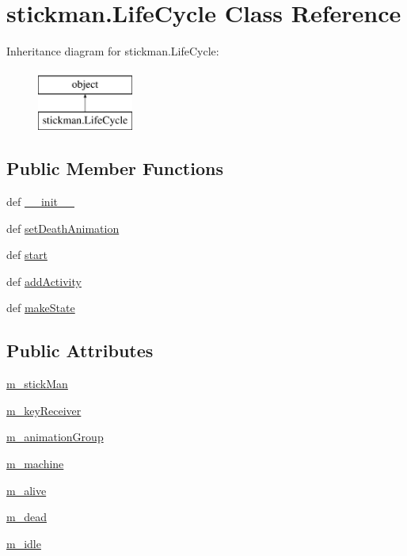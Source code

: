 \hypertarget{classstickman_1_1LifeCycle}{}\section{stickman.\+Life\+Cycle Class Reference}
\label{classstickman_1_1LifeCycle}
Inheritance diagram for stickman.\+Life\+Cycle\+:\begin{figure}[H]
\begin{center}
\leavevmode
\includegraphics[height=2.000000cm]{classstickman_1_1LifeCycle}
\end{center}
\end{figure}
\subsection*{Public Member Functions}
\begin{DoxyCompactItemize}
\item 
def \hyperlink{classstickman_1_1LifeCycle_a831b2e3b0e62bd5634c6df3cc6276dff}{\+\_\+\+\_\+init\+\_\+\+\_\+}
\item 
def \hyperlink{classstickman_1_1LifeCycle_ad5fb8303f435c77b1429837df9d4b401}{set\+Death\+Animation}
\item 
def \hyperlink{classstickman_1_1LifeCycle_abe41a90fc4e7ebfcd4be009aebe8b98d}{start}
\item 
def \hyperlink{classstickman_1_1LifeCycle_a2b3bee35784b53a506912f8cc0e9b0c7}{add\+Activity}
\item 
def \hyperlink{classstickman_1_1LifeCycle_a16d3f4539187fe5034864499aa4560c2}{make\+State}
\end{DoxyCompactItemize}
\subsection*{Public Attributes}
\begin{DoxyCompactItemize}
\item 
\hyperlink{classstickman_1_1LifeCycle_a3e1ad1451ec70ad025ec32862a83bf69}{m\+\_\+stick\+Man}
\item 
\hyperlink{classstickman_1_1LifeCycle_abbb0bcb47054712d461c20fb1ad76490}{m\+\_\+key\+Receiver}
\item 
\hyperlink{classstickman_1_1LifeCycle_adc802629e4a2ed12971bb06ea4f893c4}{m\+\_\+animation\+Group}
\item 
\hyperlink{classstickman_1_1LifeCycle_ad82e480b6b7cc709c387611fde28fa9c}{m\+\_\+machine}
\item 
\hyperlink{classstickman_1_1LifeCycle_ace8a2debb44899a9f527caf08a4f9443}{m\+\_\+alive}
\item 
\hyperlink{classstickman_1_1LifeCycle_a2e22f949d0ccec99a9a1aa9ab64da8f4}{m\+\_\+dead}
\item 
\hyperlink{classstickman_1_1LifeCycle_afb5d5ec9be76229b8448fa80cbb20117}{m\+\_\+idle}
\end{DoxyCompactItemize}


